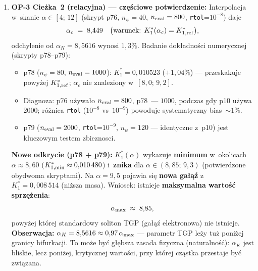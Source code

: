\begin{result}
\begin{enumerate}[nosep]
  \item \textbf{OP-3 Cie\.zka~2 (relacyjna) --- cz\k{e}\'sciowe potwierdzenie:}
    Interpolacja w~skanie $\alpha \in [4;\,12]$
    (skrypt p76, $n_\psi=40$, $n_{\rm eval}=800$, \texttt{rtol}=$10^{-8}$) daje
    \begin{equation}\label{eq:op3-alpha-c}
      \alpha_c \;=\; 8{,}449
      \quad\bigl(\text{warunek: }K^*_1(\alpha_c)=K^*_{1,\rm ref}\bigr),
    \end{equation}
    odchylenie od $\alpha_K = 8{,}5616$ wynosi $1{,}3\%$.
    Badanie dok\l{}adno\'sci numerycznej (skrypty p78--p79):
    \begin{itemize}[nosep]
      \item p78 ($n_\psi=80$, $n_{\rm eval}=1000$): $K^*_1 = 0{,}010523$
            ($+1{,}04\%$) --- przeskakuje powy\.zej $K^*_{1,\rm ref}$;
            $\alpha_c$ nie znaleziony w~$[8{,}0;\,9{,}2]$.
      \item Diagnoza: p76 u\.zywa\l{}o $n_{\rm eval}=800$, p78~--- $1000$,
            podczas gdy p10 u\.zywa $2000$; ró\.znica \texttt{rtol}
            ($10^{-8}$ vs~$10^{-9}$) powoduje systematyczny bias~$\sim 1\%$.
      \item p79 ($n_{\rm eval}=2000$, \texttt{rtol}=$10^{-9}$, $n_\psi=120$
            --- identyczne z~p10) jest kluczowym testem zbieznosci.
    \end{itemize}
    \textbf{Nowe odkrycie (p78 + p79):}
    $K^*_1(\alpha)$ wykazuje \textbf{minimum} w~okolicach $\alpha \approx 8{,}60$
    ($K^*_{\rm 1,min} \approx 0{,}010\,480$) i~\textbf{znika}
    dla $\alpha \in (8{,}85;\,9{,}3)$ (potwierdzone obydwoma skryptami).
    Na $\alpha = 9{,}5$ pojawia si\k{e} \textbf{nowa ga\l{}\k{a}\'z} z~$K^*_1 = 0{,}008\,514$
    (ni\.zsza masa).
    Wniosek: istnieje \textbf{maksymalna warto\'s\'c sprz\k{e}\.zenia}:
    \begin{equation}\label{eq:alpha-max}
      \alpha_{\rm max} \;\approx\; 8{,}85,
    \end{equation}
    powy\.zej kt\'orej standardowy soliton TGP (ga\l{}\k{a}\'z elektronowa)
    nie istnieje.
    \textbf{Obserwacja:}
    $\alpha_K = 8{,}5616 \approx 0{,}97\,\alpha_{\rm max}$ ---
    parametr TGP le\.zy tu\.z poni\.zej granicy bifurkacji.
    To mo\.ze by\'c g\l{}\k{e}bsza zasada fizyczna (naturalno\'s\'c):
    $\alpha_K$ jest bliskie, lecz poni\.zej, krytycznej warto\'sci,
    przy kt\'orej cz\k{a}stka przestaje by\'c zwi\k{a}zana.


\end{enumerate}
\end{result}
